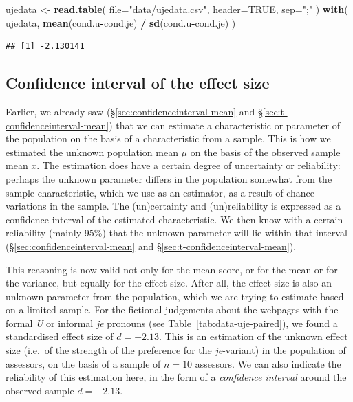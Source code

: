 \documentclass[
]{book}
\newenvironment{Shaded}{\begin{snugshade}}{\end{snugshade}}
\newcommand{\DataTypeTok}[1]{\textcolor[rgb]{0.13,0.29,0.53}{#1}}
\newcommand{\KeywordTok}[1]{\textcolor[rgb]{0.13,0.29,0.53}{\textbf{#1}}}
\newcommand{\NormalTok}[1]{#1}
\newcommand{\OperatorTok}[1]{\textcolor[rgb]{0.81,0.36,0.00}{\textbf{#1}}}
\newcommand{\OtherTok}[1]{\textcolor[rgb]{0.56,0.35,0.01}{#1}}
\newcommand{\StringTok}[1]{\textcolor[rgb]{0.31,0.60,0.02}{#1}}
\begin{document}
\begin{Shaded}
\begin{Highlighting}[]
\NormalTok{ujedata \textless{}{-}}\StringTok{ }\KeywordTok{read.table}\NormalTok{( }\DataTypeTok{file=}\StringTok{"data/ujedata.csv"}\NormalTok{, }\DataTypeTok{header=}\OtherTok{TRUE}\NormalTok{, }\DataTypeTok{sep=}\StringTok{";"}\NormalTok{ )}
\KeywordTok{with}\NormalTok{( ujedata, }\KeywordTok{mean}\NormalTok{(cond.u}\OperatorTok{{-}}\NormalTok{cond.je) }\OperatorTok{/}\StringTok{ }\KeywordTok{sd}\NormalTok{(cond.u}\OperatorTok{{-}}\NormalTok{cond.je) )}
\end{Highlighting}
\end{Shaded}

\begin{verbatim}
## [1] -2.130141
\end{verbatim}

\hypertarget{sec:confint-effectsize}{%
\subsection{Confidence interval of the effect size}\label{sec:confint-effectsize}}

Earlier, we already saw
(§\ref{sec:confidenceinterval-mean} and
§\ref{sec:t-confidenceinterval-mean})
that we can estimate a characteristic
or parameter of the population on the basis of a characteristic
from a sample. This is how we estimated the unknown population mean \(\mu\)
on the basis of the observed sample mean
\(\overline{x}\). The estimation does have a certain degree of
uncertainty or reliability: perhaps the unknown parameter differs
in the population somewhat from the sample characteristic,
which we use as an estimator, as a result of chance variations in the
sample. The (un)certainty and (un)reliability is expressed as
a confidence interval of the estimated characteristic. We then know
with a certain reliability (mainly 95\%) that the unknown parameter
will lie within that interval
(§\ref{sec:confidenceinterval-mean} and §\ref{sec:t-confidenceinterval-mean}).

This reasoning is now valid not only for the mean score, or for the mean or for the
variance, but equally for the effect size. After all, the effect size
is also an unknown parameter from the population, which we are trying to estimate
based on a limited sample. For the fictional judgements
about the webpages with the formal \emph{U} or informal \emph{je} pronouns (see
Table~\ref{tab:data-uje-paired}), we found a standardised effect size
of \(d=-2.13\). This is an estimation of the unknown
effect size (i.e.~of the strength of the preference for the \emph{je}-variant)
in the population of assessors, on the basis of a sample of \(n=10\)
assessors. We can also indicate the reliability of this estimation
here, in the form of a \emph{confidence interval} around the
observed sample \(d=-2.13\).
\end{document}
